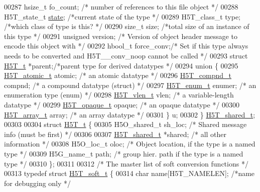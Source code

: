 \begin{DoxyCode}
00287     hsize\_t     fo\_count; \textcolor{comment}{/* number of references to this file object */}
00288     H5T\_state\_t     \hyperlink{structstate}{state}; \textcolor{comment}{/*current state of the type          */}
00289     H5T\_class\_t     type;   \textcolor{comment}{/*which class of type is this?           */}
00290     \textcolor{keywordtype}{size\_t}      size;   \textcolor{comment}{/*total size of an instance of this type     */}
00291     \textcolor{keywordtype}{unsigned}            version;        \textcolor{comment}{/* Version of object header message to encode this object with */}
00292     hbool\_t     force\_conv;\textcolor{comment}{/* Set if this type always needs to be converted and H5T\_\_conv\_noop cannot be
       called */}
00293     \textcolor{keyword}{struct }\hyperlink{struct_h5_t__t}{H5T\_t}   *parent;\textcolor{comment}{/*parent type for derived datatypes      */}
00294     \textcolor{keyword}{union }\{
00295         \hyperlink{struct_h5_t__atomic__t}{H5T\_atomic\_t}    atomic; \textcolor{comment}{/* an atomic datatype              */}
00296         \hyperlink{struct_h5_t__compnd__t}{H5T\_compnd\_t}    compnd; \textcolor{comment}{/* a compound datatype (struct)    */}
00297         \hyperlink{struct_h5_t__enum__t}{H5T\_enum\_t}    enumer; \textcolor{comment}{/* an enumeration type (enum)       */}
00298         \hyperlink{struct_h5_t__vlen__t}{H5T\_vlen\_t}    vlen;   \textcolor{comment}{/* a variable-length datatype       */}
00299         \hyperlink{struct_h5_t__opaque__t}{H5T\_opaque\_t}    opaque; \textcolor{comment}{/* an opaque datatype              */}
00300         \hyperlink{struct_h5_t__array__t}{H5T\_array\_t}  array;  \textcolor{comment}{/* an array datatype                */}
00301     \} u;
00302 \} \hyperlink{struct_h5_t__shared__t}{H5T\_shared\_t};
00303 
00304 \textcolor{keyword}{struct }\hyperlink{struct_h5_t__t}{H5T\_t} \{
00305     H5O\_shared\_t    sh\_loc;     \textcolor{comment}{/* Shared message info (must be first) */}
00306 
00307     \hyperlink{struct_h5_t__shared__t}{H5T\_shared\_t}   *shared;     \textcolor{comment}{/* all other information */}
00308     H5O\_loc\_t       oloc;       \textcolor{comment}{/* Object location, if the type is a named type */}
00309     H5G\_name\_t      path;       \textcolor{comment}{/* group hier. path if the type is a named type */}
00310 \};
00311 
00312 \textcolor{comment}{/* The master list of soft conversion functions */}
00313 \textcolor{keyword}{typedef} \textcolor{keyword}{struct }\hyperlink{struct_h5_t__soft__t}{H5T\_soft\_t} \{
00314     \textcolor{keywordtype}{char}    name[H5T\_NAMELEN];  \textcolor{comment}{/*name for debugging only        */}

\end{DoxyCode}
